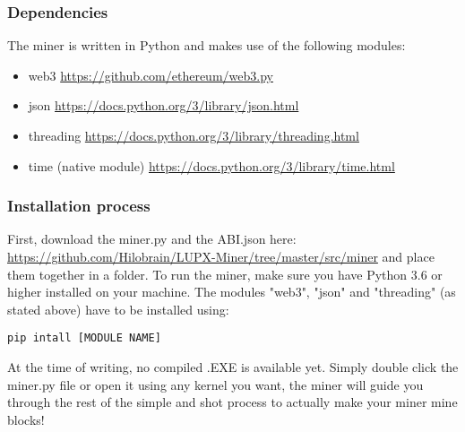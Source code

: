 \documentclass{article}
\begin{document}
\subsubsection{Dependencies}
The miner is written in Python and makes use of the following modules:
\begin{itemize}
    \item web3 \url{https://github.com/ethereum/web3.py}
    \item json \url{https://docs.python.org/3/library/json.html}
    \item threading \url{https://docs.python.org/3/library/threading.html}
    \item time (native module) \url{https://docs.python.org/3/library/time.html}
\end{itemize}

\subsubsection{Installation process}
First, download the miner.py and the ABI.json  here: \url{https://github.com/Hilobrain/LUPX-Miner/tree/master/src/miner} and place them together in a folder. To run the miner, make sure you have Python 3.6 or higher installed on your machine. The modules "web3", "json" and "threading" (as stated above) have to be installed using:
\begin{verbatim}
pip intall [MODULE NAME]    
\end{verbatim}
At the time of writing, no compiled .EXE is available yet. Simply double click the miner.py file or open it using any kernel you want, the miner will guide you through the rest of the simple and shot process to actually make your miner mine blocks! 
\end{document}
